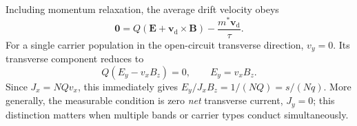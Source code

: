 Including momentum relaxation, the average drift velocity obeys
\begin{equation}
  \bm 0
  =Q\left(\bm E+\bm v_{\mathrm d}\times\bm B\right)
  -\frac{m^*\bm v_{\mathrm d}}{\tau}.
  \label{eq:transport-hall-force-balance}
\end{equation}
For a single carrier population in the open-circuit transverse direction,
$v_y=0$.  Its transverse component reduces to
\begin{equation}
  Q(E_y-v_xB_z)=0,
  \qquad E_y=v_xB_z.
  \label{eq:transport-hall-transverse-force-balance}
\end{equation}
Since $J_x=NQv_x$, this immediately gives
$E_y/J_xB_z=1/(NQ)=s/(Nq)$.  More generally, the measurable condition is zero
\emph{net} transverse current, $J_y=0$; this distinction matters when multiple
bands or carrier types conduct simultaneously.

